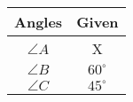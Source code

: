 \begin{tabular}[12pt]{ |c| c|}
    \hline
    \textbf{Angles} & \textbf{Given}\\ 
    \hline
     $\angle{A}$  & X \\
    \hline 
     $\angle{B}$ & $60^\circ$\\
    \hline
     $\angle{C}$& $45^\circ$\\
    \hline
    \end{tabular}
